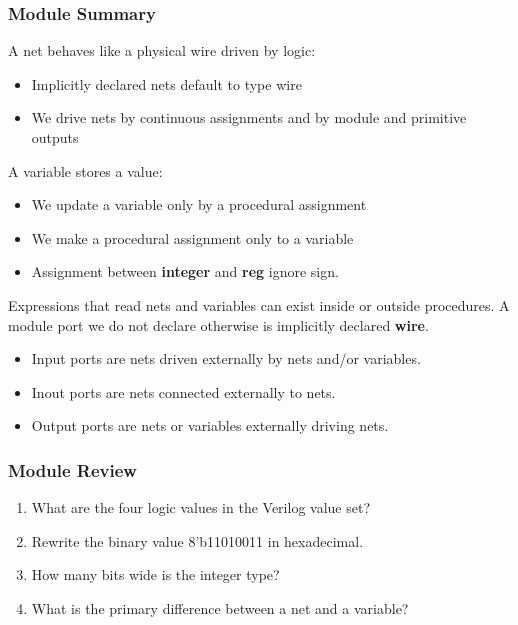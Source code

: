 \documentclass[t, notes, xcolor=table]{beamer}
\begin{document}
\begin{frame}
\frametitle{Module Summary}
A net behaves like a physical wire driven by logic:
\begin{itemize}
\item Implicitly declared nets default to type wire
\item We drive nets by continuous assignments and by module and primitive outputs
\end{itemize}
A variable stores a value:
\begin{itemize}
\item We update a variable only by a procedural assignment
\item We make a procedural assignment only to a variable
\item Assignment between \textbf{integer} and \textbf{reg} ignore sign.
\end{itemize}
Expressions that read nets and variables can exist inside or outside procedures.
A module port we do not declare otherwise is implicitly declared \textbf{wire}.
\begin{itemize}
\item Input ports are nets driven externally by nets and/or variables.
\item Inout ports are nets connected externally to nets.
\item Output ports are nets or variables externally driving nets.
\end{itemize}
\end{frame}

\begin{frame}
\frametitle{Module Review}
\begin{enumerate}
\item What are the four logic values in the Verilog value set?
\item Rewrite the binary value 8'b11010011 in hexadecimal.
\item How many bits wide is the integer type?
\item What is the primary difference between a net and a variable?
\end{enumerate}
\end{frame}
\end{document}
